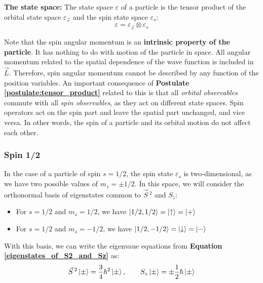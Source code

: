 \begin{postulate} \label{postulate:tensor_product}
    \textbf{The state space:} The state space $\varepsilon$ of a particle is the tensor product of the orbital state space $\varepsilon_{\vec{r}}$ and the spin state space $\varepsilon_s$:
    \begin{equation}
        \varepsilon = \varepsilon_{\vec{r}} \otimes \varepsilon_s
    \end{equation}
\end{postulate}

Note that the spin angular momentum is an \textbf{intrinsic property of the particle}. It has nothing to do with motion of the particle in space. All angular momentum related to the spatial dependence of the wave function is included in $\vec{L}$. Therefore, spin angular momentum cannot be described by any function of the position variables. An important consequence of \textbf{Postulate \ref{postulate:tensor_product}} related to this is that all \textit{orbital observables} commute with all \textit{spin observables}, as they act on different state spaces. Spin operators act on the spin part and leave the spatial part unchanged, and vice versa. In other words, the spin of a particle and its orbital motion do not affect each other. 

\subsubsection{Spin 1/2}

In the case of a particle of spin $s=1/2$, the spin state $\varepsilon_s$ is two-dimensional, as we have two possible values of $m_s = \pm 1/2$. In this space, we will consider the orthonormal basis of eigenstates common to $\vec{S}\,^2$ and $S_z$:
\begin{itemize}
    \item For $s=1/2$ and $m_s=1/2$, we have $\ket{1/2, 1/2} = \ket{\uparrow}=\ket{+}$
    \item For $s=1/2$ and $m_s=-1/2$, we have $\ket{1/2, -1/2} = \ket{\downarrow}=\ket{-}$
\end{itemize}

With this basis, we can write the eigenvaue equations from \textbf{Equation \ref{eigenstates_of_S2_and_Sz}} as:
\begin{equation} \label{eq:spin_1/2_eigenstates}
    \vec{S}\,^2\ket{\pm} =\frac{3}{4}\hbar^2\ket{\pm}, \qquad S_z\ket{\pm} = \pm\frac{1}{2}\hbar\ket{\pm}
\end{equation}

